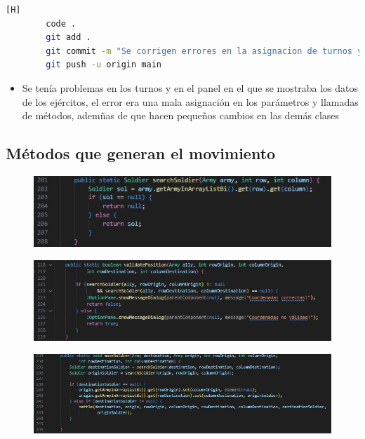 \documentclass{article}
\begin{document}
	
	
	
	\begin{lstlisting}[language=bash,caption={Commit: 664ff566e31489f0451de0caaae62cb852a9ffb8 }][H]
		code .
		git add .
		git commit -m "Se corrigen errores en la asignacion de turnos y ahora el panel que muestra las estadisticas se actualiza correctamente"			
		git push -u origin main
	\end{lstlisting}
	
	
	\begin{itemize}
		\item Se tenía problemas en los turnos y en el panel en el que se mostraba los datos de los ejércitos, el error era una mala asignación en los parámetros y llamadas de métodos, ademñas de que hacen pequeños cambios en las demás clases 
	\end{itemize}
	
	
	\subsection{Métodos que generan el movimiento}
	
	
	
	\begin{figure}[H]
		\centering
		\includegraphics[width=1\textwidth,keepaspectratio]{img/search.jpg}
	\end{figure}
	
	\begin{figure}[H]
		\centering
		\includegraphics[width=1\textwidth,keepaspectratio]{img/validate.jpg}
	\end{figure}
	
	
		\begin{figure}[H]
		\centering
		\includegraphics[width=1\textwidth,keepaspectratio]{img/move.jpg}
	\end{figure}
	
\end{document}
